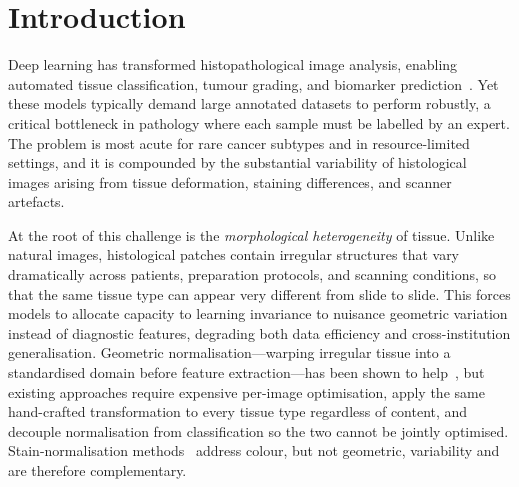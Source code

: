 \documentclass[pdflatex,sn-nature]{sn-jnl}%
\theoremstyle{thmstyleone}%
\theoremstyle{thmstyletwo}%
\theoremstyle{thmstylethree}%
\begin{document}

\maketitle
\section{Introduction}
\label{sec:introduction}

Deep learning has transformed histopathological image analysis, enabling
automated tissue classification, tumour grading, and biomarker
prediction~\cite{huang2024surface,kuntz2021gastrointestinal,chaunzwa2021deep,hirra2021breast,wetstein2022deep}.
Yet these models typically demand large annotated datasets to perform robustly,
a critical bottleneck in pathology where each sample must be labelled by an
expert. The problem is most acute for rare cancer subtypes and in
resource-limited settings, and it is compounded by the substantial variability of
histological images arising from tissue deformation, staining differences, and
scanner artefacts.

At the root of this challenge is the \textit{morphological heterogeneity} of
tissue. Unlike natural images, histological patches contain irregular structures
that vary dramatically across patients, preparation protocols, and scanning
conditions, so that the same tissue type can appear very different from slide to
slide. This forces models to allocate capacity to learning invariance to
nuisance geometric variation instead of diagnostic features, degrading both data
efficiency and cross-institution generalisation. Geometric normalisation---warping
irregular tissue into a standardised domain before feature extraction---has been
shown to help~\cite{huang2024surface}, but existing approaches require expensive
per-image optimisation, apply the same hand-crafted transformation to every
tissue type regardless of content, and decouple normalisation from classification
so the two cannot be jointly optimised. Stain-normalisation
methods~\cite{macenko2009method,shaban2019staingan} address colour, but not
geometric, variability and are therefore complementary.
\end{document}
